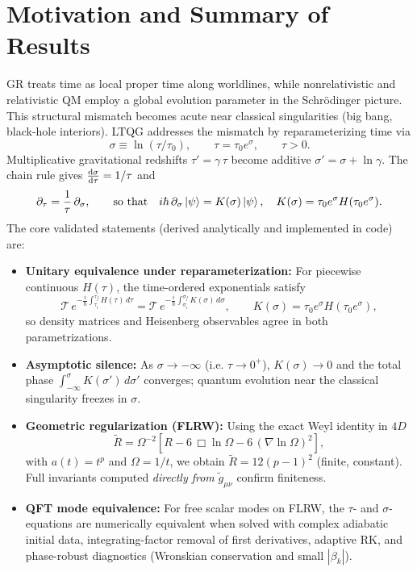 \documentclass[11pt]{article}
\begin{document}
\section{Motivation and Summary of Results}
GR treats time as local proper time along worldlines, while nonrelativistic and relativistic QM employ a global evolution parameter in the Schr\"odinger picture. This structural mismatch becomes acute near classical singularities (big bang, black-hole interiors). LTQG addresses the mismatch by reparameterizing time via
\begin{equation}
  \sigma \equiv \ln(\tau/\tau_0), \qquad \tau=\tau_0 e^{\sigma}, \qquad \tau>0.
\end{equation}
Multiplicative gravitational redshifts \(\tau'\!=\!\gamma\,\tau\) become additive \(\sigma'\!=\!\sigma+\ln\gamma\). The chain rule gives \( \dv{\sigma}{\tau}=1/\tau \) and
\begin{equation}
  \partial_\tau = \frac{1}{\tau}\,\partial_\sigma, \qquad \text{so that}\quad
  i\hbar\,\partial_\sigma \ket{\psi} = K(\sigma)\ket{\psi}, \quad
  K(\sigma)=\tau_0 e^\sigma H(\tau_0 e^\sigma). \label{eq:sigmaSE}
\end{equation}
The core validated statements (derived analytically and implemented in code) are:
\begin{itemize}
\item \textbf{Unitary equivalence under reparameterization:} For piecewise continuous \(H(\tau)\), the time-ordered exponentials satisfy
\begin{equation}
  \mathcal T\,e^{-\frac{i}{\hbar}\int_{\tau_i}^{\tau_f} H(\tau)\,d\tau}
  =
  \mathcal T\,e^{-\frac{i}{\hbar}\int_{\sigma_i}^{\sigma_f} K(\sigma)\,d\sigma}, \qquad
  K(\sigma)=\tau_0 e^\sigma H(\tau_0 e^\sigma),
\end{equation}
so density matrices and Heisenberg observables agree in both parametrizations.
\item \textbf{Asymptotic silence:} As \(\sigma\to-\infty\) (i.e. \(\tau\to 0^+\)), \(K(\sigma)\to 0\) and the total phase \(\int_{-\infty}^{\sigma}K(\sigma')\,d\sigma'\) converges; quantum evolution near the classical singularity freezes in $\sigma$.
\item \textbf{Geometric regularization (FLRW):} Using the exact Weyl identity in $4D$
\begin{equation}
  \tilde R = \Omega^{-2}\!\left[ R - 6\,\Box \ln \Omega - 6\,(\nabla\ln\Omega)^2 \right], \label{eq:WeylR}
\end{equation}
with \(a(t)=t^p\) and \(\Omega=1/t\), we obtain \(\tilde R = 12(p-1)^2\) (finite, constant). Full invariants computed \emph{directly from} \(\tilde g_{\mu\nu}\) confirm finiteness.
\item \textbf{QFT mode equivalence:} For free scalar modes on FLRW, the $\tau$- and $\sigma$-equations are numerically equivalent when solved with complex adiabatic initial data, integrating-factor removal of first derivatives, adaptive RK, and phase-robust diagnostics (Wronskian conservation and small \(|\beta_k|\)).
\end{itemize}
\end{document}
